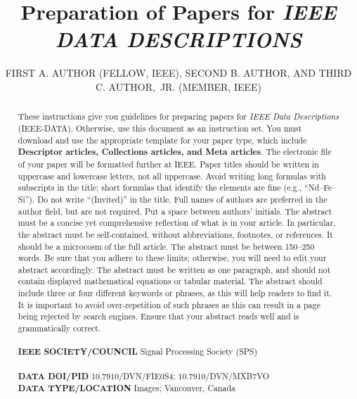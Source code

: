 \documentclass{IEEEoj-data}
\begin{document}

\title{Preparation of Papers for \textit{IEEE DATA DESCRIPTIONS}}

\author{FIRST A. AUTHOR (FELLOW, IEEE), SECOND B.
AUTHOR, AND THIRD C. AUTHOR,~JR.
(MEMBER, IEEE)}

\begin{abstract}
These instructions give you guidelines for preparing papers for \textit{IEEE Data Descriptions} (IEEE-DATA).
 Otherwise, use this document as an instruction set. You must download and use the appropriate template for your paper type, which include \textbf{Descriptor articles, Collections articles,  and Meta articles}. The electronic file of your paper will be formatted further at IEEE. Paper titles should be written in uppercase and lowercase letters, not all uppercase. Avoid writing long formulas with subscripts in the title; short formulas that identify the elements are fine (e.g., ``Nd--Fe--Si''). Do not write ``(Invited)'' in the title. Full names of authors are preferred in the author field, but are not required. Put a space between authors' initials. The abstract must be a concise yet comprehensive reflection of what is in your article. In particular, the abstract must be self-contained, without abbreviations, footnotes, or references. It should be a microcosm of the full article. The abstract must be between 150--250 words. Be sure that you adhere to these limits; otherwise, you will need to edit your abstract accordingly. The abstract must be written as one paragraph, and should not contain displayed mathematical equations or tabular material. The abstract should include three or four different keywords or phrases, as this will help readers to find it. It is important to avoid over-repetition of such phrases as this can result in a page being rejected by search engines. Ensure that your abstract reads well and is grammatically correct.\\ 
 \\ 
 {\textcolor{ieeedata}{\abstractheadfont\bfseries{IEEE SOCIETY/COUNCIL}}}     Signal Processing Society (SPS)\\  
 \\
 {\textcolor{ieeedata}{\abstractheadfont\bfseries{DATA DOI/PID}}}     10.7910/DVN/FIE0S4; 10.7910/DVN/MXB7VO\\ 
  
 {\textcolor{ieeedata}{\abstractheadfont\bfseries{DATA TYPE/LOCATION}}}   Images; Vancouver, Canada

\end{abstract}
\end{document}
